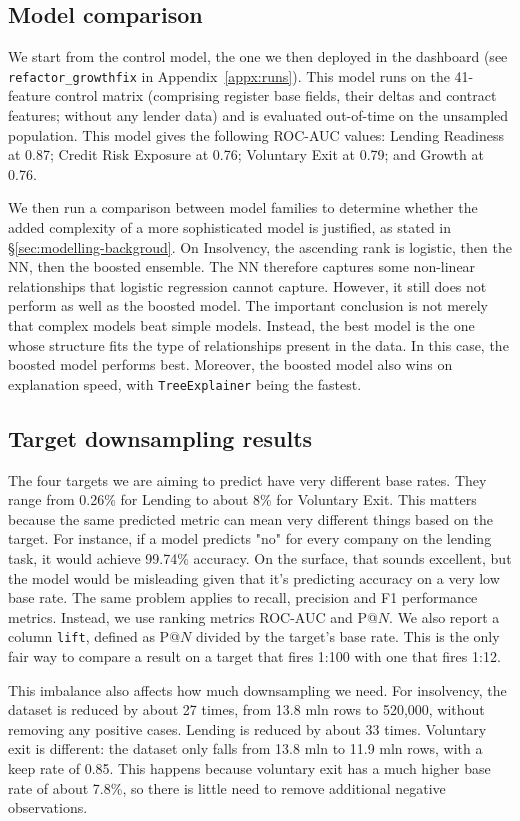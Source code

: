 \documentclass[    author={Samuel Menon Demelo; Sneha Saphala Ram Prasad; 
Viktor Ander Lindholm; Vishal Khatri},
               supervisor={Prof. Fernando Moreno-Pino},
                   degree={MSc},
                    title={Lloyds Commercial Banking Intelligence},
                 subtitle={Ranking SME Lending, Risk and Growth Prospects for Lloyds Banking Group},
                     type={},
                     year={2026}]{dissertation}
\begin{document}
\subsection{Model comparison}
We start from the control model, the one we then deployed in the dashboard (see \texttt{refactor\_growthfix} in Appendix~\ref{appx:runs}). This model runs on the 41-feature control matrix (comprising register base fields, their deltas and contract features; without any lender data) and is evaluated out-of-time on the unsampled population. This model gives the following ROC-AUC values: Lending Readiness at 0.87; Credit Risk Exposure at 0.76; Voluntary Exit at 0.79; and Growth at 0.76.

We then run a comparison between model families to determine whether the added complexity of a more sophisticated model is justified, as stated in \S\ref{sec:modelling-backgroud}. On Insolvency, the ascending rank is logistic, then the NN, then the boosted ensemble. The NN therefore captures some non-linear relationships that logistic regression cannot capture. However, it still does not perform as well as the boosted model.
The important conclusion is not merely that complex models beat simple models. Instead, the best model is the one whose structure fits the type of relationships present in the data. In this case, the boosted model performs best. Moreover, the boosted model also wins on explanation speed, with \texttt{TreeExplainer} being the fastest.

\subsection{Target downsampling results}
The four targets we are aiming to predict have very different base rates. They range from 0.26\% for Lending to about 8\% for Voluntary Exit. This matters because the same predicted metric can mean very different things based on the target. For instance, if a model predicts "no" for every company on the lending task, it would achieve 99.74\% accuracy. On the surface, that sounds excellent, but the model would be misleading given that it's predicting accuracy on a very low base rate. The same problem applies to recall, precision and F1 performance metrics. Instead, we use ranking metrics ROC-AUC and P@$N$. We also report a column \texttt{lift}, defined as P@$N$ divided by the target's base rate. This is the only fair way to compare a result on a target that fires 1:100 with one that fires 1:12.

This imbalance also affects how much downsampling we need. For insolvency, the dataset is reduced by about 27 times, from 13.8 mln rows to 520,000, without removing any positive cases. Lending is reduced by about 33 times. Voluntary exit is different: the dataset only falls from 13.8 mln to 11.9 mln rows, with a keep rate of 0.85. This happens because voluntary exit has a much higher base rate of about 7.8\%, so there is little need to remove additional negative observations.
\end{document}

